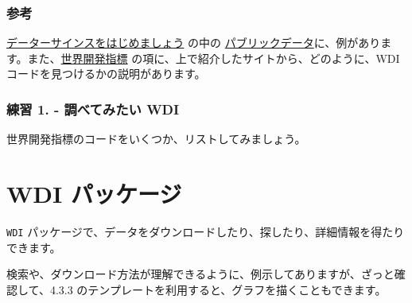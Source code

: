 \documentclass[
]{article}
\begin{document}
\hypertarget{ux53c2ux8003-2}{%
\subsubsection{参考}\label{ux53c2ux8003-2}}

\href{https://icu-hsuzuki.github.io/ds4aj/}{データーサインスをはじめましょう}
の中の
\href{https://icu-hsuzuki.github.io/ds4aj/publicdata.html\#publicdata}{パブリックデータ}に、例があります。また、\href{https://icu-hsuzuki.github.io/ds4aj/worldbank.html\#world-development-indicator-wdi}{世界開発指標}
の項に、上で紹介したサイトから、どのように、WDI
コードを見つけるかの説明があります。

\hypertarget{ux7df4ux7fd2-1.---ux8abfux3079ux3066ux307fux305fux3044-wdi}{%
\subsubsection{練習 1. - 調べてみたい
WDI}\label{ux7df4ux7fd2-1.---ux8abfux3079ux3066ux307fux305fux3044-wdi}}

世界開発指標のコードをいくつか、リストしてみましょう。

\hypertarget{wdi-ux30d1ux30c3ux30b1ux30fcux30b8}{%
\section{WDI パッケージ}\label{wdi-ux30d1ux30c3ux30b1ux30fcux30b8}}

\texttt{WDI}
パッケージで、データをダウンロードしたり、探したり、詳細情報を得たりできます。

検索や、ダウンロード方法が理解できるように、例示してありますが、ざっと確認して、4.3.3
のテンプレートを利用すると、グラフを描くこともできます。
\end{document}
